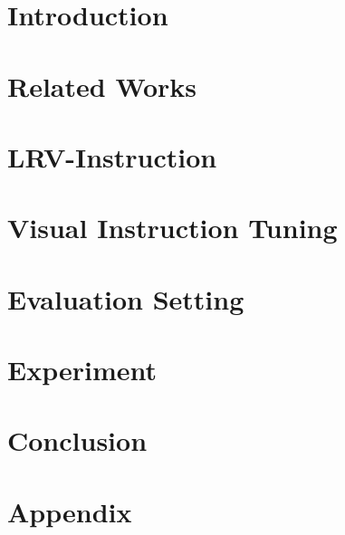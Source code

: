 \documentclass[letterpaper,10pt]{article}
\begin{document}
\section{Introduction}

\label{sec:Introduction}

\section{Related Works}

\label{sec:related_work}


\section{LRV-Instruction}

\label{sec:dataset}

\section{Visual Instruction Tuning}

\label{sec:method}

\section{Evaluation Setting}

\label{sec:Evaluation}

\section{Experiment}

\label{sec:Experiment}

\section{Conclusion}

\label{sec:Conclusion}






%
%
%


\clearpage
\appendix
\section{Appendix}

\label{sec:appendix}
\end{document}
